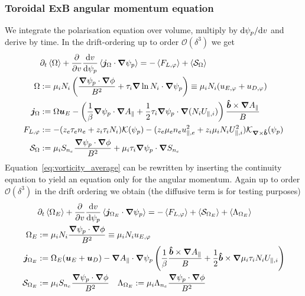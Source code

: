 \subsubsection{Toroidal ExB angular momentum equation} \label{sec:vorticity_eq}
We integrate the polarisation equation over volume, multiply by $\mathrm{d} \psi_p/\mathrm{d} v$ and derive by time. In the drift-ordering up to order $\mathcal O(\delta^3)$ we get
\begin{align}
    &\partial_t \left \langle \Omega \right \rangle + \frac{\partial}{\partial v}\frac{\mathrm{d} v}{\mathrm{d}\psi_p}\left \langle {\boldsymbol{j}}_\Omega\cdot{\boldsymbol{\nabla}}\psi_p \right \rangle = -\left \langle F_{L,\varphi} \right \rangle + \left \langle \mathcal S_\Omega \right \rangle \label{eq:vorticity_average} \\
\Omega &:= \mu_i N_i \left(\frac{{\boldsymbol{\nabla}}\psi_p\cdot{\boldsymbol{\nabla}}\phi}{B^2} + \tau_i {\boldsymbol{\nabla}}\ln N_i\cdot{\boldsymbol{\nabla}}\psi_p\right) \equiv \mu_i N_i(u_{E,\varphi} + u_{D,\varphi}) \\
{\boldsymbol{j}}_{\Omega} &:= \Omega {\boldsymbol{u}}_E
    - \left(\frac{1}{\beta} {\boldsymbol{\nabla}}\psi_p \cdot{\boldsymbol{\nabla}} A_\parallel +\frac{1}{2}\tau_i {\boldsymbol{\nabla}}\psi_p\cdot{\boldsymbol{\nabla}}  (N_iU_{\parallel,i})\right)\frac{\bm{\hat{b}}\times{\boldsymbol{\nabla}} A_\parallel}{B} \\
    F_{L,\varphi} &:=  -(z_e \tau_e n_e + z_i\tau_i N_i)\mathcal K(\psi_p) - (z_e\mu_e n_eu_{\parallel,e}^2 + z_i\mu_i N_iU_{\parallel,i}^2)\mathcal K_{{\boldsymbol{\nabla}}\times\bm{\hat{b}}}(\psi_p) \\
    \mathcal S_\Omega &:= \mu_i S_{n_e} \frac{{\boldsymbol{\nabla}}\psi_p\cdot{\boldsymbol{\nabla}} \phi}{B^2} + \mu_i\tau_i{\boldsymbol{\nabla}}\psi_p\cdot{\boldsymbol{\nabla}} S_{n_e} \label{eq:em_source}
\end{align}
Equation~\eqref{eq:vorticity_average} can be rewritten by inserting the continuity equation to yield an equation only for the \ExB angular momentum. Again up to order $\mathcal O(\delta^3)$ in the drift ordering we obtain
(the diffusive term is for testing purposes)
\begin{align}
&\partial_t \left \langle \Omega_E \right \rangle + \frac{\partial}{\partial v} \frac{\mathrm{d} v}{\mathrm{d} \psi_p}\left \langle  {\boldsymbol{j}}_{\Omega_E}\cdot{\boldsymbol{\nabla}}\psi_p \right \rangle = -\left \langle F_{L,\varphi} \right \rangle+ \left \langle \mathcal S_{\Omega_E} \right \rangle + \left \langle \Lambda_{\Omega_E} \right \rangle \label{eq:exb_average} \\
\Omega_E &:= \mu_i N_i \frac{{\boldsymbol{\nabla}}\psi_p\cdot{\boldsymbol{\nabla}}\phi}{B^2} \equiv \mu_i N_i u_{E,\varphi} \\
{\boldsymbol{j}}_{\Omega_E} &:= \Omega_E ({\boldsymbol{u}}_E + {\boldsymbol{u}}_D)
    - {\boldsymbol{\nabla}} A_\parallel\cdot{\boldsymbol{\nabla}}\psi_p \left(\frac{1}{\beta} \frac{\bm{\hat{b}}\times{\boldsymbol{\nabla}} A_\parallel}{B} +\frac{1}{2} \bm{\hat{b}} \times {\boldsymbol{\nabla}} \mu_i \tau_i N_iU_{\parallel,i}\right) \\
    \mathcal S_{\Omega_E} &:= \mu_i S_{n_e} \frac{{\boldsymbol{\nabla}}\psi_p\cdot{\boldsymbol{\nabla}}\phi}{B^2} \quad
    \Lambda_{\Omega_E} := \mu_i \Lambda_{n_e}\frac{{\boldsymbol{\nabla}}\psi_p\cdot{\boldsymbol{\nabla}}\phi}{B^2}
\end{align}
